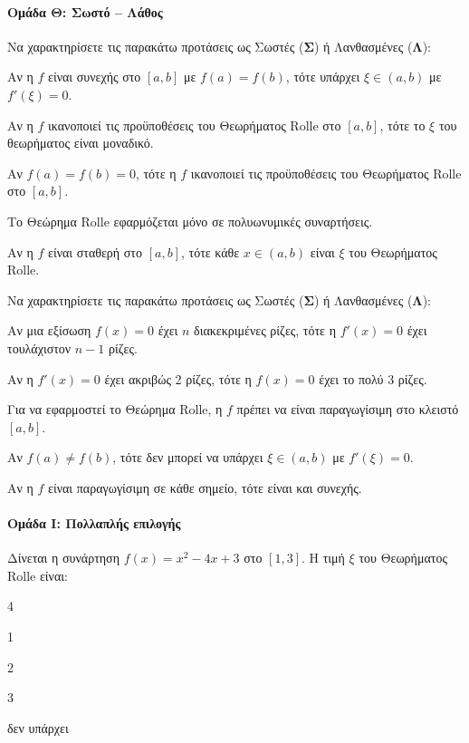 \documentclass[11pt,a4paper,modern]{FFExercises}
\begin{document}
\paragraph{Ομάδα Θ: Σωστό -- Λάθος}

\askhsh
Να χαρακτηρίσετε τις παρακάτω προτάσεις ως Σωστές (\textbf{Σ}) ή Λανθασμένες (\textbf{Λ}):
\begin{alist}
  \item Αν η $f$ είναι συνεχής στο $[a, b]$ με $f(a) = f(b)$, τότε υπάρχει $\xi \in (a, b)$ με $f'(\xi) = 0$.
  \item Αν η $f$ ικανοποιεί τις προϋποθέσεις του Θεωρήματος Rolle στο $[a, b]$, τότε το $\xi$ του θεωρήματος είναι μοναδικό.
  \item Αν $f(a) = f(b) = 0$, τότε η $f$ ικανοποιεί τις προϋποθέσεις του Θεωρήματος Rolle στο $[a, b]$.
  \item Το Θεώρημα Rolle εφαρμόζεται μόνο σε πολυωνυμικές συναρτήσεις.
  \item Αν η $f$ είναι σταθερή στο $[a, b]$, τότε κάθε $x \in (a, b)$ είναι $\xi$ του Θεωρήματος Rolle.
\end{alist}

\askhsh
Να χαρακτηρίσετε τις παρακάτω προτάσεις ως Σωστές (\textbf{Σ}) ή Λανθασμένες (\textbf{Λ}):
\begin{alist}
  \item Αν μια εξίσωση $f(x) = 0$ έχει $n$ διακεκριμένες ρίζες, τότε η $f'(x) = 0$ έχει τουλάχιστον $n-1$ ρίζες.
  \item Αν η $f'(x) = 0$ έχει ακριβώς 2 ρίζες, τότε η $f(x) = 0$ έχει το πολύ 3 ρίζες.
  \item Για να εφαρμοστεί το Θεώρημα Rolle, η $f$ πρέπει να είναι παραγωγίσιμη στο κλειστό $[a, b]$.
  \item Αν $f(a) \neq f(b)$, τότε δεν μπορεί να υπάρχει $\xi \in (a, b)$ με $f'(\xi) = 0$.
  \item Αν η $f$ είναι παραγωγίσιμη σε κάθε σημείο, τότε είναι και συνεχής.
\end{alist}


\paragraph{Ομάδα Ι: Πολλαπλής επιλογής}

\askhsh
Δίνεται η συνάρτηση $f(x) = x^2 - 4x + 3$ στο $[1, 3]$. Η τιμή $\xi$ του Θεωρήματος Rolle είναι:
\begin{multicols}{4}
\begin{alist}
  \item 1
  \item 2
  \item 3
  \item δεν υπάρχει
\end{alist}
\end{multicols}
\end{document}
